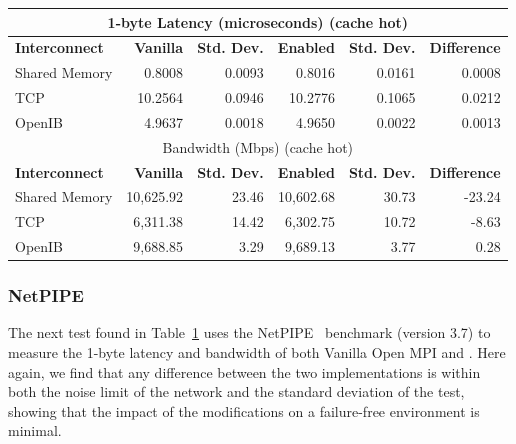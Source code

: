 \begin{table}
	\label{tab:ulfm:netpipe}
	\begin{center}\sf\scriptsize
		\begin{tabular}{|l||r|r||r|r||r|}
			\multicolumn{6}{c}{1-byte Latency (microseconds) (cache hot)} \\
			\hline
			\cellcolor[gray]{0.7}\textbf{Interconnect}  & \cellcolor[gray]{0.7}\textbf{Vanilla}   & \cellcolor[gray]{0.7}\textbf{Std. Dev.} &
			\cellcolor[gray]{0.7}\textbf{Enabled}         & \cellcolor[gray]{0.7}\textbf{Std. Dev.} & \cellcolor[gray]{0.7}\textbf{Difference} \\
			\hline
			\cellcolor[gray]{0.9}Shared Memory &  0.8008 & 0.0093 &  0.8016 & 0.0161 &  0.0008 \\
			\cellcolor[gray]{0.9}TCP           & 10.2564 & 0.0946 & 10.2776 & 0.1065 &  0.0212 \\
			\cellcolor[gray]{0.9}OpenIB        &  4.9637 & 0.0018 &  4.9650 & 0.0022 &  0.0013 \\
			\hline
			\multicolumn{6}{c}{Bandwidth (Mbps) (cache hot)} \\
			\hline
			\cellcolor[gray]{0.7}\textbf{Interconnect}  & \cellcolor[gray]{0.7}\textbf{Vanilla}   & \cellcolor[gray]{0.7}\textbf{Std. Dev.} &
			\cellcolor[gray]{0.7}\textbf{Enabled}         & \cellcolor[gray]{0.7}\textbf{Std. Dev.} & \cellcolor[gray]{0.7}\textbf{Difference} \\
			\hline
			\cellcolor[gray]{0.9}Shared Memory &  10,625.92 &  23.46 &  10,602.68 & 30.73 & -23.24 \\
			\cellcolor[gray]{0.9}TCP           &   6,311.38 &  14.42 &   6,302.75 & 10.72 &  -8.63 \\
			\cellcolor[gray]{0.9}OpenIB        &   9,688.85 &   3.29 &   9,689.13 &  3.77 &   0.28 \\
			\hline
		\end{tabular}
	\end{center}
\end{table}

\subsubsection{NetPIPE}

The next test found in Table~\ref{tab:ulfm:netpipe} uses the NetPIPE~\cite{netpipe} 
benchmark (version 3.7) to measure the 1-byte latency and bandwidth of both 
Vanilla Open MPI and \ulfm. Here again, we find that any difference between the 
two implementations is within both the noise limit of the network and the standard 
deviation of the test, showing that the impact of the \ulfm modifications on a 
failure-free \mpi environment is minimal.

